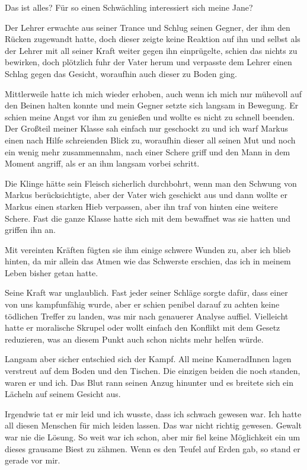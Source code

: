 \documentclass[11pt, a5paper]{article}
\newcommand{\Te}{Jane} %
\newcommand{\rs}{Markus } %
\begin{document}
\begin{spacing}{1.2}
		\frqq Das ist alles? Für so einen Schwächling interessiert sich meine \Te ?\flqq
		
		Der Lehrer erwachte aus seiner Trance und Schlug seinen Gegner, der ihm den Rücken zugewandt hatte, doch dieser zeigte keine Reaktion auf ihn und selbst als der Lehrer mit all seiner Kraft weiter gegen ihn einprügelte, schien das nichts zu bewirken, doch plötzlich fuhr der Vater herum und verpasste dem Lehrer einen Schlag gegen das Gesicht, woraufhin auch dieser zu Boden ging.
		
		Mittlerweile hatte ich mich wieder erhoben, auch wenn ich mich nur mühevoll auf den Beinen halten konnte und mein Gegner setzte sich langsam in Bewegung. Er schien meine Angst vor ihm zu genießen und wollte es nicht zu schnell beenden. Der Großteil meiner Klasse sah einfach nur geschockt zu und ich warf \rs einen nach Hilfe schreienden Blick zu, woraufhin dieser all seinen Mut und noch ein wenig mehr zusammennahm, nach einer Schere griff und den Mann in dem Moment angriff, als er an ihm langsam vorbei schritt.
		
		Die Klinge hätte sein Fleisch sicherlich durchbohrt, wenn man den Schwung von \rs berücksichtigte, aber der Vater wich geschickt aus und dann wollte er \rs einen starken Hieb verpassen, aber ihn traf von hinten eine weitere Schere. Fast die ganze Klasse hatte sich mit dem bewaffnet was sie hatten und griffen ihn an.
		
		Mit vereinten Kräften fügten sie ihm einige schwere Wunden zu, aber ich blieb hinten, da mir allein das Atmen wie das Schwerste erschien, das ich in meinem Leben bisher getan hatte.
		
		Seine Kraft war unglaublich. Fast jeder seiner Schläge sorgte dafür, dass einer von uns kampfunfähig wurde, aber er schien penibel darauf zu achten keine tödlichen Treffer zu landen, was mir nach genauerer Analyse auffiel. Vielleicht hatte er moralische Skrupel oder wollt einfach den Konflikt mit dem Gesetz reduzieren, was an diesem Punkt auch schon nichts mehr helfen würde.
		
		Langsam aber sicher entschied sich der Kampf. All meine KameradInnen lagen verstreut auf dem Boden und den Tischen. Die einzigen beiden die noch standen, waren er und ich. Das Blut rann seinen Anzug hinunter und es breitete sich ein Lächeln auf seinem Gesicht aus.
		
		Irgendwie tat er mir leid und ich wusste, dass ich schwach gewesen war. Ich hatte all diesen Menschen für mich leiden lassen. Das war nicht richtig gewesen. Gewalt war nie die Lösung. So weit war ich schon, aber mir fiel keine Möglichkeit ein um dieses grausame Biest zu zähmen. Wenn es den Teufel auf Erden gab, so stand er gerade vor mir.
		

\end{spacing}
\end{document}
